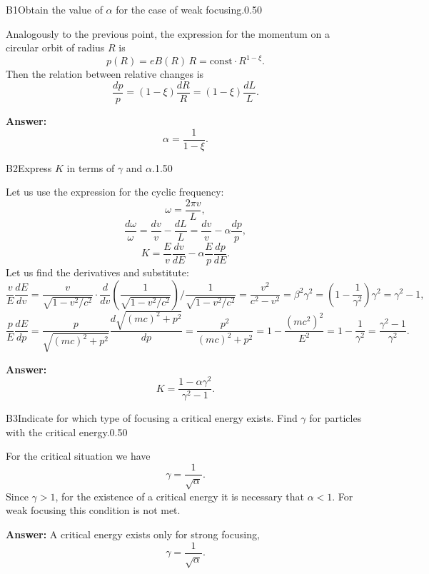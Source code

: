\documentclass[11pt,a4paper]{article}
\begin{document}
\begin{solcard}{B1}{Obtain the value of $\alpha$ for the case of weak focusing.}{0.50}

Analogously to the previous point, the expression for the momentum on a circular orbit of radius $R$ is $$p(R) = eB(R)\,R = \text{const}\cdot R^{1-\xi}.$$ Then the relation between relative changes is $$\frac{dp}{p} = (1-\xi)\frac{dR}{R} = (1-\xi)\frac{dL}{L}.$$

\par\smallskip\noindent\textbf{Answer:} $$\alpha = \frac{1}{1-\xi}.$$
\end{solcard}

\begin{solcard}{B2}{Express $K$ in terms of $\gamma$ and $\alpha$.}{1.50}

Let us use the expression for the cyclic frequency: $$\omega = \frac{2\pi v}{L},$$ $$\frac{d\omega}{\omega} = \frac{dv}{v} - \frac{dL}{L} = \frac{dv}{v} - \alpha\frac{dp}{p},$$ $$K = \frac{E}{v}\frac{dv}{dE} - \alpha\frac{E}{p}\frac{dp}{dE}.$$ Let us find the derivatives and substitute: $$\frac{v}{E}\frac{dE}{dv} = \frac{v}{\sqrt{1-v^2/c^2}}\cdot\frac{d}{dv}\!\left(\frac{1}{\sqrt{1-v^2/c^2}}\right)\bigg/\frac{1}{\sqrt{1-v^2/c^2}} = \frac{v^2}{c^2-v^2} = \beta^2\gamma^2 = \left(1-\frac{1}{\gamma^2}\right)\gamma^2 = \gamma^2-1,$$ $$\frac{p}{E}\frac{dE}{dp} = \frac{p}{\sqrt{(mc)^2+p^2}}\frac{d\sqrt{(mc)^2+p^2}}{dp} = \frac{p^2}{(mc)^2+p^2} = 1-\frac{(mc^2)^2}{E^2} = 1-\frac{1}{\gamma^2} = \frac{\gamma^2-1}{\gamma^2}.$$

\par\smallskip\noindent\textbf{Answer:} $$K = \frac{1-\alpha\gamma^2}{\gamma^2-1}.$$
\end{solcard}

\begin{solcard}{B3}{Indicate for which type of focusing a critical energy exists. Find $\gamma$ for particles with the critical energy.}{0.50}

For the critical situation we have $$\gamma = \frac{1}{\sqrt{\alpha}}.$$ Since $\gamma > 1$, for the existence of a critical energy it is necessary that $\alpha < 1$. For weak focusing this condition is not met.

\par\smallskip\noindent\textbf{Answer:} A critical energy exists only for strong focusing, $$\gamma = \frac{1}{\sqrt{\alpha}}.$$
\end{solcard}
\end{document}
